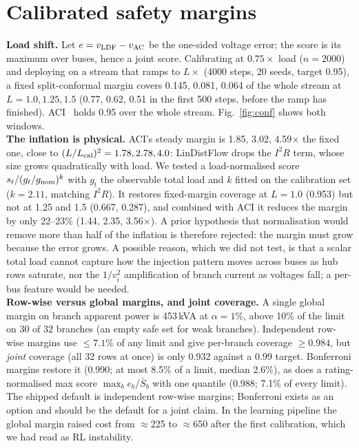 \documentclass[10pt]{article}
\begin{document}
\section{Calibrated safety margins}\label{sec:conf}
\textbf{Load shift.} Let $e=v_{\rm LDF}-v_{\rm AC}$ be the one-sided voltage error; the score is its maximum over buses, hence a joint score. Calibrating at $0.75\times$ load ($n=2000$) and deploying on a stream that ramps to $L\times$ (4000 steps, 20 seeds, target 0.95), a fixed split-conformal margin covers 0.145, 0.081, 0.064 of the whole stream at $L=1.0,1.25,1.5$ (0.77, 0.62, 0.51 in the first 500 steps, before the ramp has finished). ACI~\cite{aci} holds 0.95 over the whole stream. Fig.~\ref{fig:conf} shows both windows.\\
\textbf{The inflation is physical.} ACI's steady margin is 1.85, 3.02, 4.59$\times$ the fixed one, close to $(L/L_{\rm cal})^2=1.78,2.78,4.0$: LinDistFlow drops the $I^2R$ term, whose size grows quadratically with load. We tested a load-normalised score $s_t/(g_t/g_{\rm nom})^k$ with $g_t$ the observable total load and $k$ fitted on the calibration set ($k=2.11$, matching $I^2R$). It restores fixed-margin coverage at $L=1.0$ (0.953) but not at 1.25 and 1.5 (0.667, 0.287), and combined with ACI it reduces the margin by only 22--23\% (1.44, 2.35, 3.56$\times$). A prior hypothesis that normalisation would remove more than half of the inflation is therefore rejected: the margin must grow because the error grows. A possible reason, which we did not test, is that a scalar total load cannot capture how the injection pattern moves across buses as hub rows saturate, nor the $1/v_i^2$ amplification of branch current as voltages fall; a per-bus feature would be needed.\\
\textbf{Row-wise versus global margins, and joint coverage.} A single global margin on branch apparent power is 453\,kVA at $\alpha=1\%$, above 10\% of the limit on 30 of 32 branches (an empty safe set for weak branches). Independent row-wise margins use $\le7.1\%$ of any limit and give per-branch coverage $\ge0.984$, but \emph{joint} coverage (all 32 rows at once) is only 0.932 against a 0.99 target. Bonferroni margins restore it (0.990; at most 8.5\% of a limit, median 2.6\%), as does a rating-normalised max score $\max_b e_b/\bar S_b$ with one quantile (0.988; 7.1\% of every limit). The shipped default is independent row-wise margins; Bonferroni exists as an option and should be the default for a joint claim. In the learning pipeline the global margin raised cost from $\approx$225 to $\approx$650 after the first calibration, which we had read as RL instability.
\end{document}
